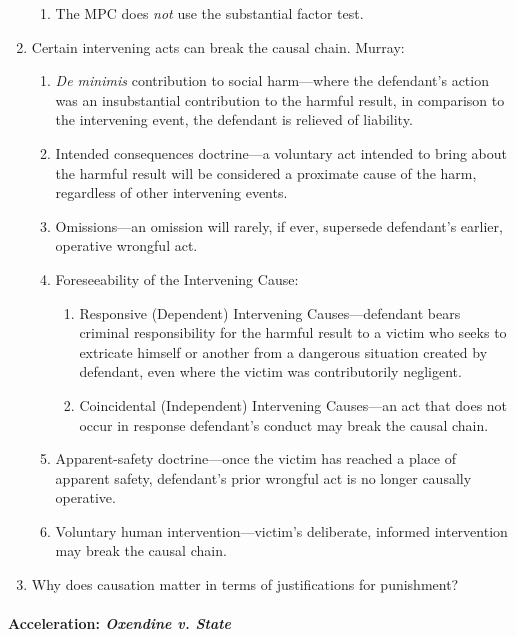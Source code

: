 \begin{enumerate}
\begin{enumerate}
        \item The MPC does \emph{not} use the substantial factor test.
    \end{enumerate}
    \item Certain intervening acts can break the causal chain. Murray: 
    \begin{enumerate}
        \item \emph{De minimis} contribution to social harm---where the defendant's action was an insubstantial contribution to the harmful result, in comparison to the intervening event, the defendant is relieved of liability.
        \item Intended consequences doctrine---a voluntary act intended to bring about the harmful result will be considered a proximate cause of the harm, regardless of other intervening events.
        \item Omissions---an omission will rarely, if ever, supersede defendant's earlier, operative wrongful act.
        \item Foreseeability of the Intervening Cause:
        \begin{enumerate}
            \item Responsive (Dependent) Intervening Causes---defendant bears criminal responsibility for the harmful result to a victim who seeks to extricate himself or another from a dangerous situation created by defendant, even where the victim was contributorily negligent.
            \item Coincidental (Independent) Intervening Causes---an act that does not occur in response defendant's conduct may break the causal chain.
        \end{enumerate}
        \item Apparent-safety doctrine---once the victim has reached a place of apparent safety, defendant's prior wrongful act is no longer causally operative.
        \item Voluntary human intervention---victim's deliberate, informed intervention may break the causal chain.
    \end{enumerate}
    \item Why does causation matter in terms of justifications for punishment?
\end{enumerate}

\paragraph{Acceleration: \emph{Oxendine v. State}}

